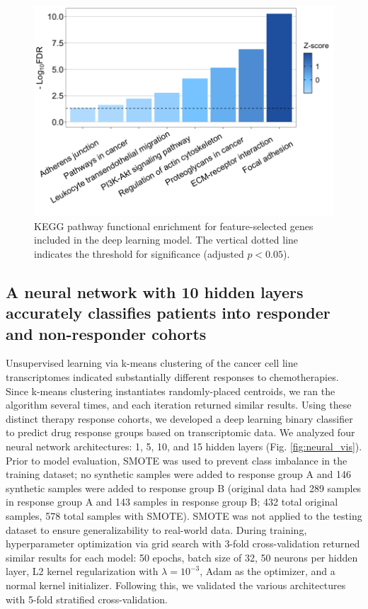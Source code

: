 \documentclass[10pt, letterpaper, twocolumn]{article}
\begin{document}
\begin{figure}[t]
	\centering
	\includegraphics[width=\columnwidth]{Figures/kegg.png}
	\caption{KEGG pathway functional enrichment for feature-selected genes included in the deep learning model. The vertical dotted line indicates the threshold for significance (adjusted $p < 0.05$).}
	\label{fig:kegg}
\end{figure}


\subsection{A neural network with 10 hidden layers accurately classifies patients into responder and non-responder cohorts}
Unsupervised learning via k-means clustering of the cancer cell line transcriptomes indicated substantially different responses to chemotherapies. Since k-means clustering instantiates randomly-placed centroids, we ran the algorithm several times, and each iteration returned similar results. Using these distinct therapy response cohorts, we developed a deep learning binary classifier to predict drug response groups based on transcriptomic data. We analyzed four neural network architectures: 1, 5, 10, and 15 hidden layers (Fig. \ref{fig:neural_vis}). Prior to model evaluation, SMOTE was used to prevent class imbalance in the training dataset; no synthetic samples were added to response group A and 146 synthetic samples were added to response group B (original data had 289 samples in response group A and 143 samples in response group B; 432 total original samples, 578 total samples with SMOTE). SMOTE was not applied to the testing dataset to ensure generalizability to real-world data. During training, hyperparameter optimization via grid search with 3-fold cross-validation returned similar results for each model: 50 epochs, batch size of 32, 50 neurons per hidden layer, L2 kernel regularization with $\lambda=10^{-3}$, Adam as the optimizer, and a normal kernel initializer. Following this, we validated the various architectures with 5-fold stratified cross-validation.
\end{document}
